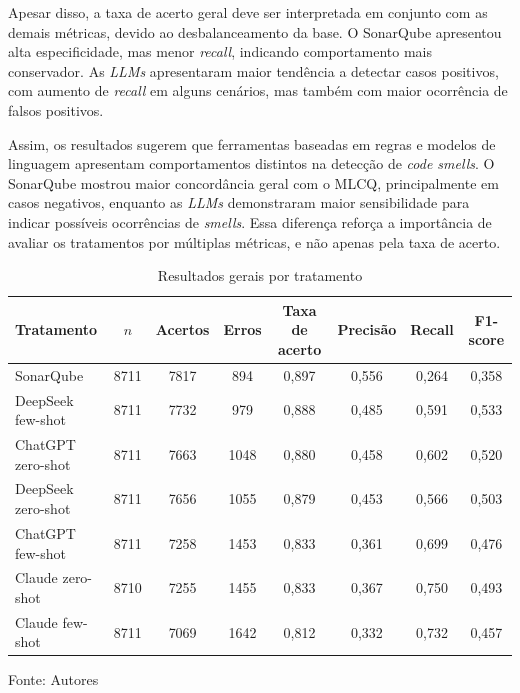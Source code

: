 Apesar disso, a taxa de acerto geral deve ser interpretada em conjunto com as demais métricas, devido ao desbalanceamento da base. 
O SonarQube apresentou alta especificidade, mas menor \textit{recall}, indicando comportamento mais conservador. 
As \textit{LLMs} apresentaram maior tendência a detectar casos positivos, com aumento de \textit{recall} em alguns cenários, 
mas também com maior ocorrência de falsos positivos.

Assim, os resultados sugerem que ferramentas baseadas em regras e modelos de linguagem apresentam comportamentos 
distintos na detecção de \textit{code smells}. O SonarQube mostrou maior concordância geral com o MLCQ, principalmente 
em casos negativos, enquanto as \textit{LLMs} demonstraram maior sensibilidade para indicar possíveis ocorrências de \textit{smells}. 
Essa diferença reforça a importância de avaliar os tratamentos por múltiplas métricas, e não apenas pela taxa de acerto.

\begin{table}[H]
\centering
\caption{Resultados gerais por tratamento}
\label{tab:resultados-gerais-tratamento}
\begin{tabular}{lccccccc}
\hline
Tratamento & $n$ & Acertos & Erros & Taxa de acerto & Precisão & Recall & F1-score \\
\hline
SonarQube & 8711 & 7817 & 894 & 0,897 & 0,556 & 0,264 & 0,358 \\
DeepSeek few-shot & 8711 & 7732 & 979 & 0,888 & 0,485 & 0,591 & 0,533 \\
ChatGPT zero-shot & 8711 & 7663 & 1048 & 0,880 & 0,458 & 0,602 & 0,520 \\
DeepSeek zero-shot & 8711 & 7656 & 1055 & 0,879 & 0,453 & 0,566 & 0,503 \\
ChatGPT few-shot & 8711 & 7258 & 1453 & 0,833 & 0,361 & 0,699 & 0,476 \\
Claude zero-shot & 8710 & 7255 & 1455 & 0,833 & 0,367 & 0,750 & 0,493 \\
Claude few-shot & 8711 & 7069 & 1642 & 0,812 & 0,332 & 0,732 & 0,457 \\
\hline
\end{tabular}

Fonte: Autores
\end{table}
